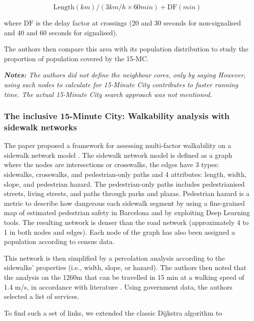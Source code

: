 $$\text{Length}(km) / (3 km/h \times 60 min) + \text{DF} (min)$$

where $\text{DF}$ is the delay factor at crossings (20 and 30 seconds for non-signalised and 40 and 60 seconds for signalised).

The authors then compare this area with its population distribution to study the proportion of population covered by the 15-MC.

\textit{\textbf{Notes:} The authors did not define the neighbour cores, only by saying  However, using such nodes to calculate for 15-Minute City contributes to faster running time. The actual 15-Minute City search approach was not mentioned.}

\subsubsection{The inclusive 15-Minute City: Walkability analysis with sidewalk networks}

The paper proposed a framework for assessing multi-factor walkability on a sidewalk network model \cite{rhoads_inclusive_2023}. The sidewalk network model is defined as a graph where the nodes are intersections or crosswalks, the edges have 3 types: sidewalks, crosswalks, and pedestrian-only paths and 4 attributes: length, width, slope, and pedestrian hazard. The pedestrian-only paths includes pedestrianised streets, living streets, and paths through parks and plazas. Pedestrian hazard is a metric to describe how dangerous each sidewalk segment by using a fine-grained map of estimated pedestrian safety in Barcelona \cite{bustos_explainable_2021} and by exploiting Deep Learning tools. The resulting network is denser than the road network (approximately 4 to 1 in both nodes and edges). Each node of the graph has also been assigned a population according to census data.

This network is then simplified by a percolation analysis according to the sidewalks’ properties (i.e., width, slope, or hazard). The authors then noted that the analysis on the 1260m that can be travelled in 15 min at a walking speed of 1.4 m/s, in accordance with literature \cite{bosina_estimating_2017}. Using government data, the authors selected a list of services.

To find such a set of links, we extended the classic Dijkstra algorithm to

